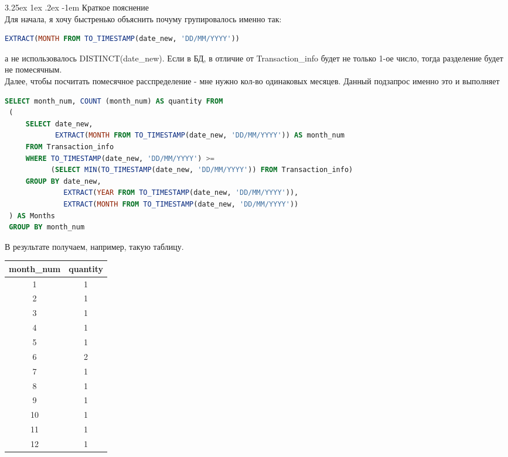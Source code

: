 \documentclass[12pt, a3paper]{article}
\makeatletter
\renewcommand\paragraph{\@startsection{paragraph}{5}{\z@}%
  {3.25ex \@plus1ex \@minus.2ex}%
  {-1em}%
  {\normalfont\normalsize\bfseries}}
\makeatother
\begin{document}
\paragraph{Краткое пояснение}
\leavevmode \\
Для начала, я хочу быстренько объяснить почуму групировалось именно так:
\begin{lstlisting}[language=SQL]
EXTRACT(MONTH FROM TO_TIMESTAMP(date_new, 'DD/MM/YYYY'))
\end{lstlisting}
а не использовалось DISTINCT(date\_new). Если в БД, в отличие от Transaction\_info
будет не только 1-ое число, тогда разделение будет не помесячным. \\
Далее, чтобы посчитать помесячное расспределение - мне нужно кол-во 
одинаковых месяцев. Данный подзапрос именно это и выполняет
\begin{lstlisting}[language=SQL]
SELECT month_num, COUNT (month_num) AS quantity FROM
 (
     SELECT date_new, 
            EXTRACT(MONTH FROM TO_TIMESTAMP(date_new, 'DD/MM/YYYY')) AS month_num 
     FROM Transaction_info 
     WHERE TO_TIMESTAMP(date_new, 'DD/MM/YYYY') >= 
           (SELECT MIN(TO_TIMESTAMP(date_new, 'DD/MM/YYYY')) FROM Transaction_info)
     GROUP BY date_new,  
              EXTRACT(YEAR FROM TO_TIMESTAMP(date_new, 'DD/MM/YYYY')), 
              EXTRACT(MONTH FROM TO_TIMESTAMP(date_new, 'DD/MM/YYYY'))
 ) AS Months
 GROUP BY month_num
\end{lstlisting}
\noindent
В результате получаем, например, такую таблицу.
\begin{table}[!h]
    \begin{tabular}{|c|c|}
    \hline
    month\_num & quantity \\ \hline
    1          & 1        \\ \hline
    2          & 1        \\ \hline
    3          & 1        \\ \hline
    4          & 1        \\ \hline
    5          & 1        \\ \hline
    6          & 2        \\ \hline
    7          & 1        \\ \hline
    8          & 1        \\ \hline
    9          & 1        \\ \hline
    10         & 1        \\ \hline
    11         & 1        \\ \hline
    12         & 1        \\ \hline
    \end{tabular}
\end{table}\\
\end{document}
